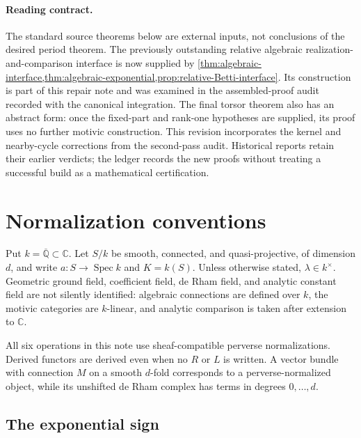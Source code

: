 \documentclass[11pt]{article}
\numberwithin{equation}{section}
\theoremstyle{definition}
\theoremstyle{remark}
\newcommand{\Q}{\mathbb Q}
\newcommand{\C}{\mathbb C}
\newcommand{\Spec}{\operatorname{Spec}}
\begin{document}
\paragraph{Reading contract.}
The standard source theorems below are external inputs, not conclusions
of the desired period theorem. The previously outstanding relative
algebraic realization-and-comparison interface is now supplied by
\cref{thm:algebraic-interface,thm:algebraic-exponential,prop:relative-Betti-interface}.
Its construction is part of this repair note and was examined in the
assembled-proof audit recorded with the canonical integration. The final torsor theorem also has an abstract form:
once the fixed-part and rank-one hypotheses are supplied, its proof uses
no further motivic construction. This revision incorporates the kernel
and nearby-cycle corrections from the second-pass audit. Historical
reports retain their earlier verdicts; the ledger records the new proofs
without treating a successful build as a mathematical certification.

\tableofcontents

\section{Normalization conventions}\label{sec:normalization}

Put $k=\overline{\Q}\subset\C$. Let $S/k$ be smooth, connected, and
quasi-projective, of dimension $d$, and write $a:S\to\Spec k$ and
$K=k(S)$. Unless otherwise stated, $\lambda\in k^\times$. Geometric ground
field, coefficient field, de Rham field, and analytic constant field are not
silently identified: algebraic connections are defined over $k$, the
motivic categories are $k$-linear, and analytic comparison is taken after
extension to $\C$.

All six operations in this note use sheaf-compatible perverse
normalizations. Derived functors are derived even when no $R$ or $L$ is
written. A vector bundle with connection $M$ on a smooth $d$-fold corresponds
to a perverse-normalized object, while its unshifted de Rham complex has
terms in degrees $0,\ldots,d$.

\subsection{The exponential sign}
\end{document}
